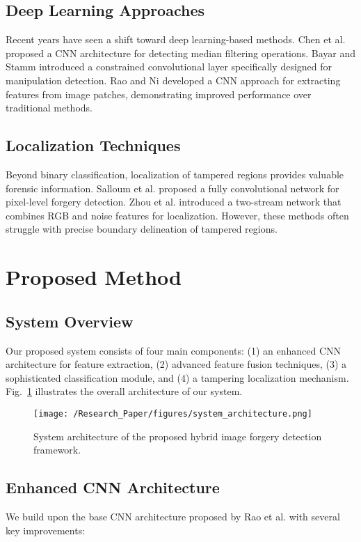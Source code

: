 \documentclass[conference]{IEEEtran}
\begin{document}
\subsection{Deep Learning Approaches}
Recent years have seen a shift toward deep learning-based methods. Chen et al. \cite{chen2015} proposed a CNN architecture for detecting median filtering operations. Bayar and Stamm \cite{bayar2016} introduced a constrained convolutional layer specifically designed for manipulation detection. Rao and Ni \cite{rao2016} developed a CNN approach for extracting features from image patches, demonstrating improved performance over traditional methods.

\subsection{Localization Techniques}
Beyond binary classification, localization of tampered regions provides valuable forensic information. Salloum et al. \cite{salloum2018} proposed a fully convolutional network for pixel-level forgery detection. Zhou et al. \cite{zhou2018} introduced a two-stream network that combines RGB and noise features for localization. However, these methods often struggle with precise boundary delineation of tampered regions.

\section{Proposed Method}

\subsection{System Overview}
Our proposed system consists of four main components: (1) an enhanced CNN architecture for feature extraction, (2) advanced feature fusion techniques, (3) a sophisticated classification module, and (4) a tampering localization mechanism. Fig.~\ref{fig:system_architecture} illustrates the overall architecture of our system.

\begin{figure}[htbp]
\centerline{\texttt{[image: /Research\_Paper/figures/system\_architecture.png]}}
\caption{System architecture of the proposed hybrid image forgery detection framework.}
\label{fig:system_architecture}
\end{figure}

\subsection{Enhanced CNN Architecture}
We build upon the base CNN architecture proposed by Rao et al. \cite{rao2016} with several key improvements:
\end{document}
